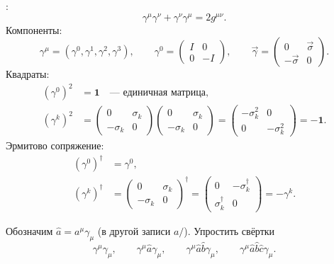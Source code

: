 \documentclass[../final.tex]{subfiles}
\begin{document}
:
\begin{equation*}
    \gamma^\mu\gamma^\nu+\gamma^\nu\gamma^\mu=2g^{\mu\nu}.
\end{equation*}
Компоненты:
\begin{equation*}
    \gamma^\mu=\left(\gamma^0,\gamma^1,\gamma^2,\gamma^3\right),
    \qquad
    \gamma^0=
    \begin{pmatrix}
        I&0\\
        0&-I
    \end{pmatrix},
    \qquad
    \vec\gamma=
    \begin{pmatrix}
        0&\vec\sigma\\
        -\vec\sigma&0
    \end{pmatrix}.
\end{equation*}
Квадраты:
\begin{align*}
    (\gamma^0)^2&=\mathbf 1 \quad\text{--- единичная матрица},\\
    (\gamma^k)^2&=
    \begin{pmatrix}
        0&\sigma_k\\
        -\sigma_k&0
    \end{pmatrix}
    \begin{pmatrix}
        0&\sigma_k\\
        -\sigma_k&0
    \end{pmatrix}
    =
    \begin{pmatrix}
        -\sigma_k^2&0\\
        0&-\sigma_k^2
    \end{pmatrix}
    =-\mathbf 1.
\end{align*}
Эрмитово сопряжение:
\begin{align*}
    (\gamma^0)^\dagger&=\gamma^0,\\
    (\gamma^k)^\dagger&=
    \begin{pmatrix}
        0&\sigma_k\\
        -\sigma_k&0
    \end{pmatrix}^\dagger
    =
    \begin{pmatrix}
        0&-\sigma_k^\dagger\\
        \sigma_k^\dagger&0
    \end{pmatrix}
    =-\gamma^k.
\end{align*}

\label{task:gamma_contractions_sem8}

\condition
Обозначим $\hat a=a^\mu\gamma_\mu$ (в другой записи $a\!\!\!/$).
Упростить свёртки
\begin{equation*}
    \gamma^\mu\gamma_\mu,\qquad
    \gamma^\mu\hat a\gamma_\mu,\qquad
    \gamma^\mu\hat a\hat b\gamma_\mu,\qquad
    \gamma^\mu\hat a\hat b\hat c\gamma_\mu.
\end{equation*}
\end{document}
